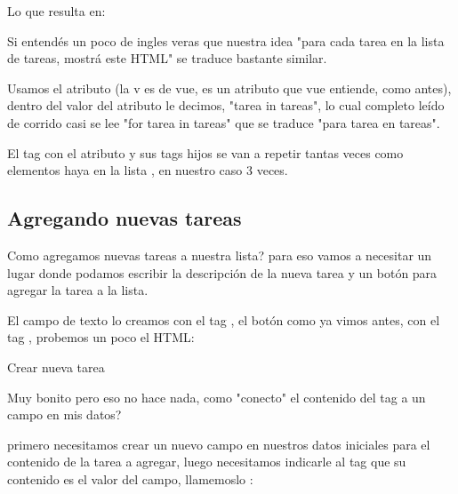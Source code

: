 \documentclass[letterpaper,10pt,spanish]{sphinxmanual}
\begin{document}
Lo que resulta en:



Si entendés un poco de ingles veras que nuestra idea "para cada tarea en la
lista de tareas, mostrá este HTML" se traduce bastante similar.

Usamos el atributo  (la v es de vue,  es un atributo que vue
entiende, como  antes), dentro del valor del atributo le decimos,
"tarea in tareas", lo cual completo  leído de corrido
casi se lee "for tarea in tareas" que se traduce "para tarea en tareas".

El tag con el atributo  y sus tags hijos se van a repetir tantas veces
como elementos haya en la lista , en nuestro caso 3 veces.


\subsection{Agregando nuevas tareas}
\label{\detokenize{un-poco-de-logica-a-la-vista:agregando-nuevas-tareas}}
Como agregamos nuevas tareas a nuestra lista? para eso vamos a necesitar un
lugar donde podamos escribir la descripción de la nueva tarea y un botón para
agregar la tarea a la lista.

El campo de texto lo creamos con el tag , el botón como ya vimos antes,
con el tag , probemos un poco el HTML:

%
\begin{sphinxVerbatim}[commandchars=\\\{\}]
Crear nueva tarea
\end{sphinxVerbatim}



Muy bonito pero eso no hace nada, como "conecto" el contenido del tag 
a un campo en mis datos?

primero necesitamos crear un nuevo campo en nuestros datos iniciales para
el contenido de la tarea a agregar, luego necesitamos indicarle al tag 
que su contenido es el valor del campo, llamemoslo :
\end{document}

